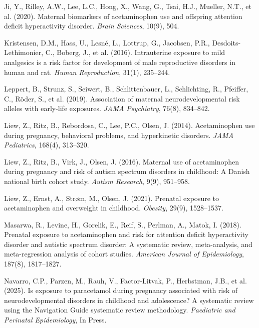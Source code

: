 \documentclass[12pt]{article}
\begin{document}
\begin{thebibliography}{99}
Ji, Y., Rilley, A.W., Lee, L.C., Hong, X., Wang, G., Tsai, H.J., Mueller, N.T., et al. (2020).
Maternal biomarkers of acetaminophen use and offspring attention deficit hyperactivity disorder.
\textit{Brain Sciences}, 10(9), 504.

Kristensen, D.M., Hass, U., Lesné, L., Lottrup, G., Jacobsen, P.R., Desdoits-Lethimonier, C., Boberg, J., et al. (2016).
Intrauterine exposure to mild analgesics is a risk factor for development of male reproductive disorders in human and rat.
\textit{Human Reproduction}, 31(1), 235--244.

Leppert, B., Strunz, S., Seiwert, B., Schlittenbauer, L., Schlichting, R., Pfeiffer, C., Röder, S., et al. (2019).
Association of maternal neurodevelopmental risk alleles with early-life exposures.
\textit{JAMA Psychiatry}, 76(8), 834--842.

Liew, Z., Ritz, B., Rebordosa, C., Lee, P.C., Olsen, J. (2014).
Acetaminophen use during pregnancy, behavioral problems, and hyperkinetic disorders.
\textit{JAMA Pediatrics}, 168(4), 313--320.

Liew, Z., Ritz, B., Virk, J., Olsen, J. (2016).
Maternal use of acetaminophen during pregnancy and risk of autism spectrum disorders in childhood: A Danish national birth cohort study.
\textit{Autism Research}, 9(9), 951--958.

Liew, Z., Ernst, A., Strøm, M., Olsen, J. (2021).
Prenatal exposure to acetaminophen and overweight in childhood.
\textit{Obesity}, 29(9), 1528--1537.

Masarwa, R., Levine, H., Gorelik, E., Reif, S., Perlman, A., Matok, I. (2018).
Prenatal exposure to acetaminophen and risk for attention deficit hyperactivity disorder and autistic spectrum disorder: A systematic review, meta-analysis, and meta-regression analysis of cohort studies.
\textit{American Journal of Epidemiology}, 187(8), 1817--1827.

Navarro, C.P., Parzen, M., Rauh, V., Factor-Litvak, P., Herbstman, J.B., et al. (2025).
Is exposure to paracetamol during pregnancy associated with risk of neurodevelopmental disorders in childhood and adolescence? A systematic review using the Navigation Guide systematic review methodology.
\textit{Paediatric and Perinatal Epidemiology}, In Press.


\end{thebibliography}
\end{document}
